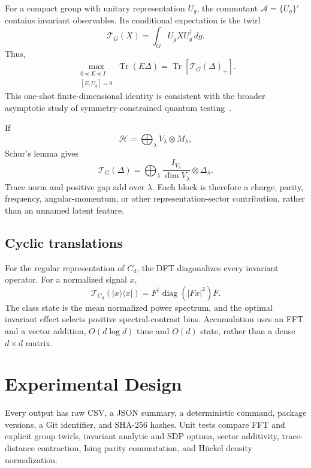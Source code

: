 \documentclass[letterpaper,journal]{IEEEtran}
\newcommand{\Tr}{\operatorname{Tr}}
\newcommand{\A}{\mathcal A}
\newcommand{\T}{\mathcal T}
\begin{document}
For a compact group with unitary representation $U_g$, the commutant
$\A=\{U_g\}'$ contains invariant observables. Its conditional expectation is
the twirl
\begin{equation}
\T_G(X)=\int_GU_gXU_g^\dagger\,dg.                  \label{eq:twirl}
\end{equation}
Thus,
\begin{equation}
\max_{\substack{0\preceq E\preceq I\\{}[E,U_g]=0}}
\Tr(E\Delta)=\Tr[\T_G(\Delta)_+].                   \label{eq:symopt}
\end{equation}
This one-shot finite-dimensional identity is consistent with the broader
asymptotic study of symmetry-constrained quantum testing~\cite{hiai2009}.

If
\begin{equation}
\mathcal H=\bigoplus_\lambda V_\lambda\otimes M_\lambda,
\end{equation}
Schur's lemma gives
\begin{equation}
\T_G(\Delta)=
\bigoplus_\lambda
\frac{I_{V_\lambda}}{\dim V_\lambda}\otimes\Delta_\lambda. \label{eq:block}
\end{equation}
Trace norm and positive gap add over $\lambda$. Each block is therefore a
charge, parity, frequency, angular-momentum, or other representation-sector
contribution, rather than an unnamed latent feature.

\subsection{Cyclic translations}

For the regular representation of $C_d$, the DFT diagonalizes every invariant
operator. For a normalized signal $x$,
\begin{equation}
\T_{C_d}(|x\rangle\langle x|)
=F^\dagger\operatorname{diag}(|Fx|^2)F.             \label{eq:power}
\end{equation}
The class state is the mean normalized power spectrum, and the optimal
invariant effect selects positive spectral-contrast bins. Accumulation uses
an FFT and a vector addition, $O(d\log d)$ time and $O(d)$ state, rather than
a dense $d\times d$ matrix.

\section{Experimental Design}

Every output has raw CSV, a JSON summary, a deterministic command, package
versions, a Git identifier, and SHA-256 hashes. Unit tests compare FFT and
explicit group twirls, invariant analytic and SDP optima, sector additivity,
trace-distance contraction, Ising parity commutation, and H{\"u}ckel density
normalization.
\end{document}
